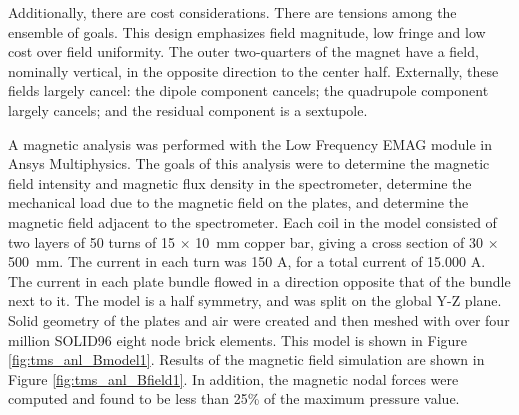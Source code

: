 Additionally, there are cost considerations. There are 
tensions among the ensemble of goals. This design emphasizes
field magnitude, low fringe and low cost over field uniformity. The outer
two-quarters of the magnet have a field, nominally vertical, in the opposite
direction to the center half. Externally, these fields largely cancel: the
dipole component cancels; the quadrupole component largely cancels; and
the residual component is a sextupole.

A magnetic analysis was performed with the Low Frequency EMAG module in Ansys Multiphysics.   The goals of this analysis were to determine the magnetic field intensity and magnetic flux density in the spectrometer, determine the mechanical load due to the magnetic field on the plates, and determine the magnetic field adjacent to the spectrometer.   Each coil in the model consisted of two layers of \num{50} turns of \num{15} $\times$ \SI{10}{\mm} copper bar, giving a cross section of \num{30} $\times$ \SI{500}{\mm}.  The current in each turn was \num{150} A, for a total current of \num{15,000} A.  The current in each plate bundle flowed in a direction opposite that of the bundle next to it.  The model is a half symmetry, and was split on the global Y-Z plane. Solid geometry of the plates and air were created and then meshed with over four million SOLID96 eight node brick elements.   This model is shown in Figure \ref{fig:tms_anl_Bmodel1}.  Results of the magnetic field simulation are shown in Figure \ref{fig:tms_anl_Bfield1}.   In addition, the magnetic nodal forces were computed and found to be less than 25\% of the maximum pressure value.  
\iffalse



